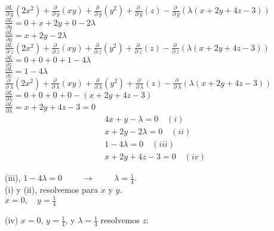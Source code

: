 \documentclass[13pt]{memoir}
\begin{document}
\begin{enumerate}
$\frac{\partial L\:}{\partial \:y}\left(2x^2\right)+\frac{\partial \:}{\partial \:y}\left(xy\right)+\frac{\partial \:}{\partial \:y}\left(y^2\right)+\frac{\partial \:}{\partial \:y}\left(z\right)-\frac{\partial \:}{\partial \:y}\left(\lambda\left(x+2y+4z-3\right)\right)$\\
$\frac{\partial L}{\partial y} = 0+x+2y+0-2\lambda$\\
$\frac{\partial L}{\partial y} = x + 2y - 2\lambda$\\

$\frac{\partial L\:}{\partial \:z}\left(2x^2\right)+\frac{\partial \:}{\partial \:z}\left(xy\right)+\frac{\partial \:}{\partial \:z}\left(y^2\right)+\frac{\partial \:}{\partial \:z}\left(z\right)-\frac{\partial \:}{\partial \:z}\left(\lambda\left(x+2y+4z-3\right)\right)$\\
$\frac{\partial L}{\partial z} = 0+0+0+1-4\lambda$\\
$\frac{\partial L}{\partial z} = 1 - 4\lambda$\\

$\frac{\partial \:}{\partial \:\lambda}\left(2x^2\right)+\frac{\partial \:}{\partial \:\lambda}\left(xy\right)+\frac{\partial \:}{\partial \:\lambda}\left(y^2\right)+\frac{\partial \:}{\partial \:\lambda}\left(z\right)-\frac{\partial \:}{\partial \:\lambda}\left(\lambda\left(x+2y+4z-3\right)\right)$\\
$\frac{\partial L}{\partial \lambda} = 0+0+0+0-\left(x+2y+4z-3\right)$\\
$\frac{\partial L}{\partial \lambda} = x + 2y + 4z - 3 = 0$\\


\begin{align*}
4x + y - \lambda = 0 \quad (i) \\
x + 2y - 2\lambda = 0 \quad (ii) \\
1 - 4\lambda = 0 \quad (iii) \\
x + 2y + 4z - 3 = 0 \quad (iv)
\end{align*}


(iii), \(1 - 4\lambda = 0\) $\qquad \rightarrow  \qquad$ \(\lambda = \frac{1}{4}\).\\


(i) y (ii), resolvemos para \(x\) y \(y\).\\

$x = 0, \quad y = \frac{1}{4}$

(iv) \(x = 0\), \(y = \frac{1}{4}\), y \(\lambda = \frac{1}{4}\) resolvemos \(z\):\\


\end{enumerate}
\end{document}
